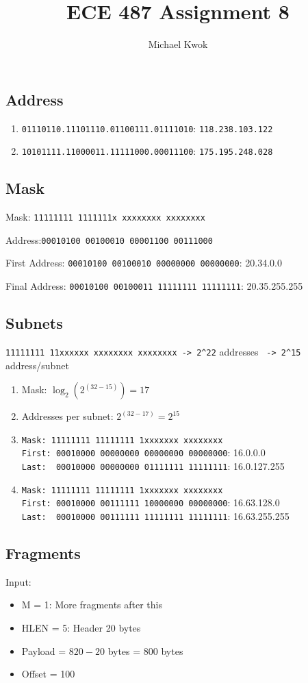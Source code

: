 \documentclass{article}
\title{ECE 487 Assignment 8}
\author{Michael Kwok}
\begin{document}
\maketitle
\subsection*{Address}
\begin{enumerate}
    \item \verb|01110110.11101110.01100111.01111010|: \verb|118.238.103.122|
    \item \verb|10101111.11000011.11111000.00011100|: \verb|175.195.248.028|
\end{enumerate}
\subsection*{Mask}
Mask:   \verb|11111111 1111111x xxxxxxxx xxxxxxxx|

Address:\verb|00010100 00100010 00001100 00111000|

First Address: \verb|00010100 00100010 00000000 00000000|: 20.34.0.0

Final Address: \verb|00010100 00100011 11111111 11111111|: 20.35.255.255

\subsection*{Subnets}
\verb|11111111 11xxxxxx xxxxxxxx xxxxxxxx -> 2^22| addresses \verb| -> 2^15| address/subnet
\begin{enumerate}
    \item Mask: \( \log_2(2^{(32-15)}) = 17 \)
    \item Addresses per subnet: \( 2^{(32-17)} = 2^{15}\)
    \item \verb|Mask: 11111111 11111111 1xxxxxxx xxxxxxxx|\\
          \verb|First: 00010000 00000000 00000000 00000000|: 16.0.0.0\\
          \verb|Last:  00010000 00000000 01111111 11111111|: 16.0.127.255
    \item \verb|Mask: 11111111 11111111 1xxxxxxx xxxxxxxx|\\
          \verb|First: 00010000 00111111 10000000 00000000|: 16.63.128.0\\
          \verb|Last:  00010000 00111111 11111111 11111111|: 16.63.255.255
\end{enumerate}

\subsection*{Fragments}
Input:
\begin{itemize}
    \item M = 1: More fragments after this
    \item HLEN = 5: Header 20 bytes
    \item Payload = \(820 - 20\) bytes = 800 bytes
    \item Offset = 100
\end{itemize}
\end{document}
